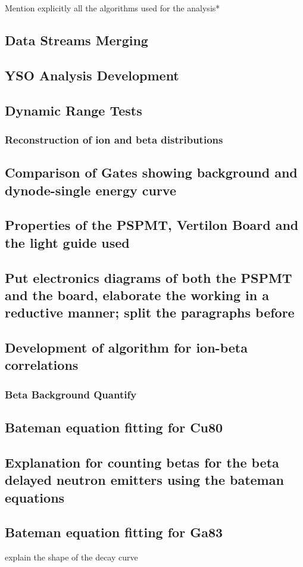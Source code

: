 \documentclass[a4paper,12pt,twoside]{report}
\begin{document}
\*Mention explicitly all the algorithms used for the analysis*\
\subsection{Data Streams Merging}
\subsection{YSO Analysis Development}
\subsection {Dynamic Range Tests}
\subsubsection{Reconstruction of ion and beta distributions}
\subsection{Comparison of Gates showing background and dynode-single energy curve}
\subsection{Properties of the PSPMT, Vertilon Board and the light guide used}
\subsection{Put electronics diagrams of both the PSPMT and the board, elaborate the working in a reductive manner; split the paragraphs before}
\subsection{Development of algorithm for ion-beta correlations}
\subsubsection{Beta Background Quantify}
\subsection{Bateman equation fitting for Cu80}
\subsection{Explanation for counting betas for the beta delayed neutron emitters using the bateman equations}
\subsection{Bateman equation fitting for Ga83}
explain the shape of the decay curve 
\end{document}

